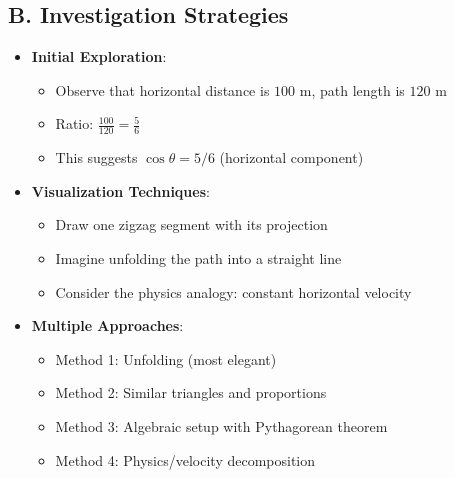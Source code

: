 \documentclass[11pt]{article}
\begin{document}
\begin{strategybox}
\subsection*{B. Investigation Strategies}
\begin{itemize}[leftmargin=*]
    \item \textbf{Initial Exploration}:
    \begin{itemize}
        \item Observe that horizontal distance is $100$ m, path length is $120$ m
        \item Ratio: $\frac{100}{120} = \frac{5}{6}$
        \item This suggests $\cos\theta = 5/6$ (horizontal component)
    \end{itemize}
    \item \textbf{Visualization Techniques}:
    \begin{itemize}
        \item Draw one zigzag segment with its projection
        \item Imagine unfolding the path into a straight line
        \item Consider the physics analogy: constant horizontal velocity
    \end{itemize}
    \item \textbf{Multiple Approaches}:
    \begin{itemize}
        \item Method 1: Unfolding (most elegant)
        \item Method 2: Similar triangles and proportions
        \item Method 3: Algebraic setup with Pythagorean theorem
        \item Method 4: Physics/velocity decomposition
    \end{itemize}
\end{itemize}


\end{strategybox}
\end{document}
